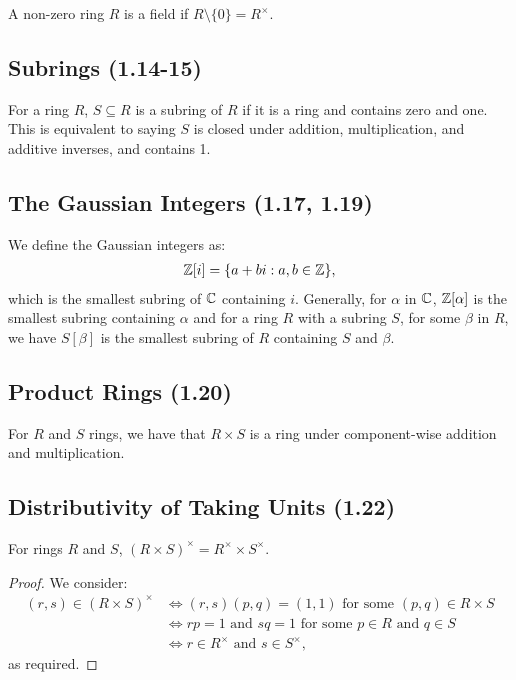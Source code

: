 A non-zero ring $R$ is a field if $R \setminus \{0\} = R^\times$.

\subsection{Subrings (1.14-15)} \label{1.14} \label{1.15}

For a ring $R$, $S \subseteq R$ is a subring of $R$ if it is a ring and contains zero and one.
This is equivalent to saying $S$ is closed under addition, multiplication, and additive inverses,
and contains 1.

\subsection{The Gaussian Integers (1.17, 1.19)} \label{1.17} \label{1.19}

We define the Gaussian integers as: \begin{align*}
    \mathbb{Z}[i] = \{a + bi : a, b \in \mathbb{Z}\},
\end{align*} which is the smallest subring of $\mathbb{C}$ containing $i$.
Generally, for $\alpha$ in $\mathbb{C}$, $\mathbb{Z}[\alpha]$ is the smallest subring
containing $\alpha$ and for a ring $R$ with a subring $S$, for some $\beta$ in
$R$, we have $S[\beta]$ is the smallest subring of $R$ containing $S$ and $\beta$.

\subsection{Product Rings (1.20)} \label{1.20}

For $R$ and $S$ rings, we have that $R \times S$ is a ring under component-wise
addition and multiplication.

\subsection{Distributivity of Taking Units (1.22)} \label{1.22}

For rings $R$ and $S$, $(R \times S)^\times = R^\times \times S^\times$.

\begin{proof}
    We consider: \begin{align*}
        (r, s) \in (R \times S)^\times
        &\Longleftrightarrow (r, s)(p, q) = (1, 1) \text{ for some } (p, q) \in R \times S \\
        &\Longleftrightarrow rp = 1 \text{ and } sq = 1 \text{ for some } 
            p \in R \text{ and } q \in S \\
        &\Longleftrightarrow r \in R^\times \text{ and } s \in S^\times,
    \end{align*} as required.
\end{proof}

